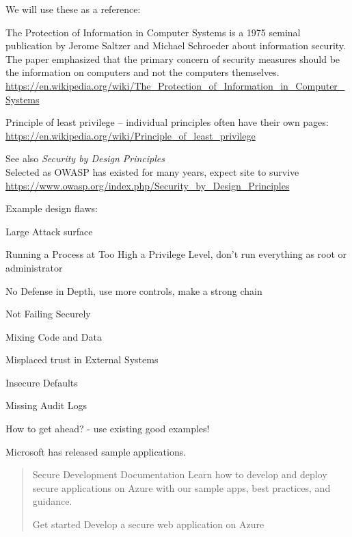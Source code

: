 \documentclass[Screen16to9,17pt]{foils}
\begin{document}
We will use these as a reference:
\begin{list2}
\item The Protection of Information in Computer Systems is a 1975 seminal publication by Jerome Saltzer and Michael Schroeder about information security. The paper emphasized that the primary concern of security measures should be the information on computers and not the computers themselves.\\
\url{https://en.wikipedia.org/wiki/The_Protection_of_Information_in_Computer_Systems}
\item Principle of least privilege -- individual principles often have their own pages:\\
\url{https://en.wikipedia.org/wiki/Principle_of_least_privilege}
\item See also \emph{Security by Design Principles}\\
Selected as OWASP has existed for many years, expect site to survive\\
\url{https://www.owasp.org/index.php/Security_by_Design_Principles}
\end{list2}




Example design flaws:
\begin{list2}
\item Large Attack surface
\item Running a Process at Too High a Privilege Level, don't run everything as root or administrator
\item No Defense in Depth, use more controls, make a strong chain
\item Not Failing Securely
\item Mixing Code and Data
\item Misplaced trust in External Systems
\item Insecure Defaults
\item Missing Audit Logs
\end{list2}


How to get ahead? - use existing good examples!

Microsoft has released sample applications.

\begin{quote}
Secure Development Documentation
Learn how to develop and deploy secure applications on Azure with our sample apps, best practices, and guidance.

Get started
Develop a secure web application on Azure
\end{quote}
\end{document}
